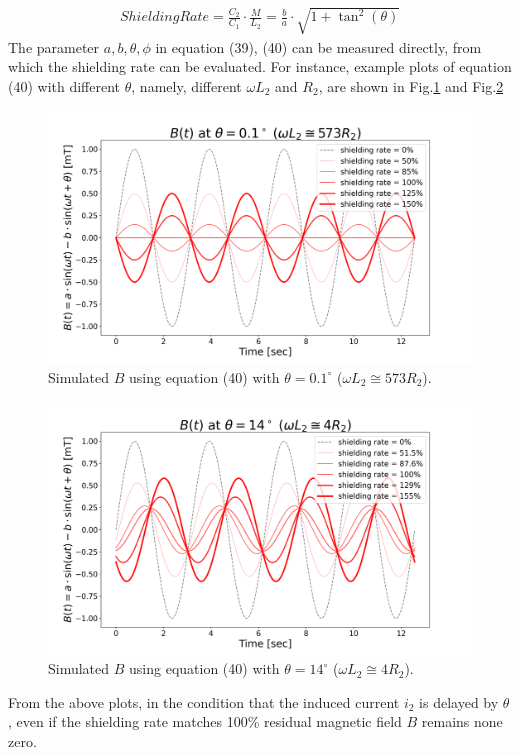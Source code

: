 \begin{eqnarray}
  Shielding Rate = \frac{C_2}{C_1}\cdot\frac{M}{L_2} = \frac{b}{a}\cdot\sqrt{1+\tan^2\left(\theta\right)}
\end{eqnarray}
The parameter $a, b, \theta, \phi$ in equation (39), (40) can be measured directly, from which the shielding rate can be evaluated.
For instance, example plots of equation (40) with different $\theta$, namely, different $\omega L_2$ and $R_2$,
are shown in Fig.\ref{fig:0.1theta} and Fig.\ref{fig:14theta}
\begin{figure}[H]
  \includegraphics[width=17cm, bb=9 9 900 550]{./section3Effectiveness/sinTestAt0.1deg.png}
  \caption{Simulated $B$ using equation (40) with $\theta = 0.1^\circ$ ($\omega L_2 \cong 573R_2$).}
  \label{fig:0.1theta}
\end{figure}
\begin{figure}[H]
  \includegraphics[width=17cm, bb=9 9 900 490]{./section3Effectiveness/sinTestAt14deg.png}
  \caption{Simulated $B$ using equation (40) with $\theta = 14^\circ$ ($\omega L_2 \cong 4R_2$).}
  \label{fig:14theta}
\end{figure}
From the above plots, in the condition that the induced current $i_2$ is delayed by $\theta$,
even if the shielding rate matches 100\% residual magnetic field $B$ remains none zero.

